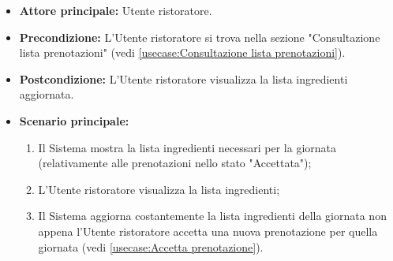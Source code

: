 \label{usecase:Consultazione lista ingredienti}
\begin{itemize}

	\item \textbf{Attore principale:} Utente ristoratore.

	\item \textbf{Precondizione:} L'Utente ristoratore si trova nella sezione "Consultazione lista prenotazioni" (vedi \autoref{usecase:Consultazione lista prenotazioni}).

	\item \textbf{Postcondizione:} L'Utente ristoratore visualizza la lista ingredienti aggiornata.

	\item \textbf{Scenario principale:}
	\begin{enumerate}
		\item Il Sistema mostra la lista ingredienti necessari per la giornata (relativamente alle prenotazioni nello stato "Accettata");
		\item L'Utente ristoratore visualizza la lista ingredienti;
		\item Il Sistema aggiorna costantemente la lista ingredienti della giornata non appena l'Utente ristoratore accetta una nuova prenotazione per quella giornata (vedi \autoref{usecase:Accetta prenotazione}).
	\end{enumerate}

\end{itemize}
